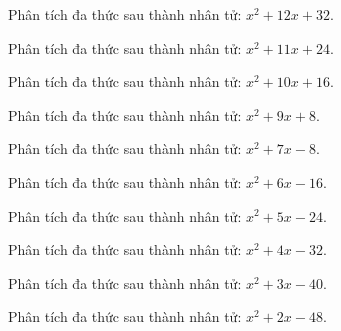 \begin{bt}
	Phân tích đa thức sau thành nhân tử: $x^2 + 12 x + 32$.
\end{bt}
\begin{bt}
	Phân tích đa thức sau thành nhân tử: $x^2 + 11 x + 24$.
\end{bt}
\begin{bt}
	Phân tích đa thức sau thành nhân tử: $x^2 + 10 x + 16$.
\end{bt}
\begin{bt}
	Phân tích đa thức sau thành nhân tử: $x^2 + 9 x + 8$.
\end{bt}
\begin{bt}
	Phân tích đa thức sau thành nhân tử: $x^2 + 7 x - 8$.
\end{bt}
\begin{bt}
	Phân tích đa thức sau thành nhân tử: $x^2 + 6 x - 16$.
\end{bt}
\begin{bt}
	Phân tích đa thức sau thành nhân tử: $x^2 + 5 x - 24$.
\end{bt}
\begin{bt}
	Phân tích đa thức sau thành nhân tử: $x^2 + 4 x - 32$.
\end{bt}
\begin{bt}
	Phân tích đa thức sau thành nhân tử: $x^2 + 3 x - 40$.
\end{bt}
\begin{bt}
	Phân tích đa thức sau thành nhân tử: $x^2 + 2 x - 48$.
\end{bt}
